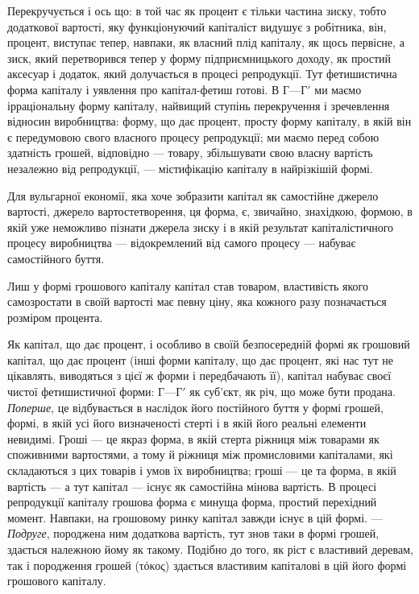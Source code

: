 Перекручується і ось що: в той час як процент є тільки
частина зиску, тобто додаткової вартості, яку функціонуючий
капіталіст видушує з робітника, він, процент, виступає тепер,
навпаки, як власний плід капіталу, як щось первісне, а зиск,
який перетворився тепер у форму підприємницького доходу,
як простий аксесуар і додаток, який долучається в процесі репродукції.
Тут фетишистична форма капіталу і уявлення про
капітал-фетиш готові. В $Г — Г'$ ми маємо ірраціональну форму
капіталу, найвищий ступінь перекручення і зречевлення відносин
виробництва: форму, що дає процент, просту форму капіталу,
в якій він є передумовою свого власного процесу репродукції;
ми маємо перед собою здатність грошей, відповідно —
товару, збільшувати свою власну вартість незалежно від репродукції,
— містифікацію капіталу в найрізкішій формі.

Для вульгарної економії, яка хоче зобразити капітал як самостійне
джерело вартості, джерело вартостетворення, ця форма,
є, звичайно, знахідкою, формою, в якій уже неможливо пізнати
джерела зиску і в якій результат капіталістичного процесу
виробництва — відокремлений від самого процесу — набуває самостійного
буття.

Лиш у формі грошового капіталу капітал став товаром,
властивість якого самозростати в своїй вартості має певну ціну,
яка кожного разу позначається розміром процента.

Як капітал, що дає процент, і особливо в своїй безпосередній
формі як грошовий капітал, що дає процент (інші форми капіталу,
що дає процент, які нас тут не цікавлять, виводяться
з цієї ж форми і передбачають її), капітал набуває своєї чистої
фетишистичної форми: $Г — Г'$ як суб’єкт, як річ, що може бути
продана. \emph{Поперше}, це відбувається в наслідок його постійного
буття у формі грошей, формі, в якій усі його визначеності стерті
і в якій його реальні елементи невидимі. Гроші — це якраз форма,
в якій стерта ріжниця між товарами як споживними вартостями,
а тому й ріжниця між промисловими капіталами, які складаються з
цих товарів і умов їх виробництва; гроші — це та форма, в якій
вартість — а тут капітал — існує як самостійна мінова вартість.
В процесі репродукції капіталу грошова форма є минуща форма,
простий перехідний момент. Навпаки, на грошовому ринку капітал
завжди існує в цій формі. — \emph{Подруге}, породжена ним додаткова
вартість, тут знов таки в формі грошей, здається належною
йому як такому. Подібно до того, як ріст є властивий
деревам, так і породження грошей (\textgreek{τόκος}) здається властивим
капіталові в цій його формі грошового капіталу.

